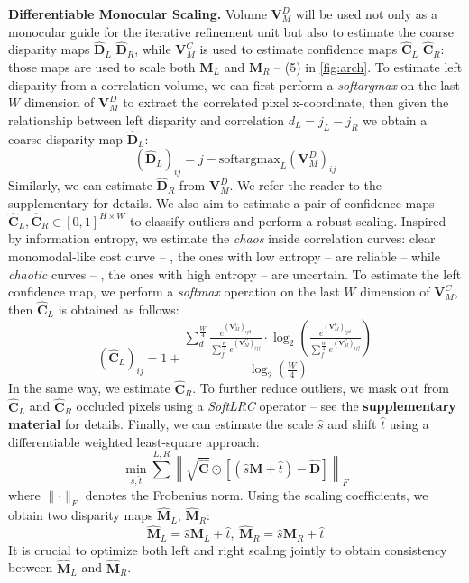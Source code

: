 \textbf{Differentiable Monocular Scaling.} Volume $\mathbf{V}^D_M$ will be used not only as a monocular guide for the iterative refinement unit but also to estimate the coarse disparity maps $\hat{\mathbf{D}}_L$ $\hat{\mathbf{D}}_R$, while $\mathbf{V}^C_M$ is used to estimate confidence maps $\hat{\mathbf{C}}_L$ $\hat{\mathbf{C}}_R$: those maps are used to scale both $\mathbf{M}_L$ and $\mathbf{M}_R$ -- (5) in \cref{fig:arch}. 
To estimate left disparity from a correlation volume, we can first perform a \textit{softargmax} on the last $W$ dimension of $\mathbf{V}^D_M$ to extract the correlated pixel x-coordinate, then given the relationship between left disparity and correlation $d_L=j_L-j_R$ we obtain a coarse disparity map $\hat{\mathbf{D}}_L$: 
\begin{equation} 
    (\hat{\mathbf{D}}_L)_{ij} = j - \text{softargmax}_L(\mathbf{V}^D_M)_{ij}
    \label{eq:softmax_left}
\end{equation}
Similarly, we can estimate $\hat{\mathbf{D}}_R$ from $\mathbf{V}^D_M$. We refer the reader to the supplementary for details.
We also aim to estimate a pair of confidence maps $\hat{\mathbf{C}}_L, \hat{\mathbf{C}}_R \in [0,1]^{H \times W}$ to classify outliers and perform a robust scaling.
Inspired by information entropy, we estimate the \textit{chaos} inside correlation curves: clear monomodal-like cost curve -- \ie, the ones with low entropy -- are reliable -- while \textit{chaotic} curves -- \ie, the ones with high entropy -- are uncertain.
To estimate the left confidence map, we perform a \textit{softmax} operation on the last $W$ dimension of $\mathbf{V}^C_M$, then $\hat{\mathbf{C}}_L$ is obtained as follows:
\begin{equation}
    (\hat{\mathbf{C}}_L)_{ij} = 1  + \frac{\sum_{d}^{\frac{W}{4}} \frac{e^{(\mathbf{V}^C_M)_{ijd}}}{\sum_{f}^{\frac{W}{4}} e^{(\mathbf{V}^C_M)_{ijf}}} \cdot \log_2 \left( \frac{e^{(\mathbf{V}^C_M)_{ijd}}}{\sum_{f}^{\frac{W}{4}} e^{(\mathbf{V}^C_M)_{ijf}}} \right)}{\log_2(\frac{W}{4})}
    \label{eq:confidence_left}
\end{equation}
In the same way, we estimate $\hat{\mathbf{C}}_R$.
To further reduce outliers, we mask out from $\hat{\mathbf{C}}_L$ and $\hat{\mathbf{C}}_R$ occluded pixels using a \textit{SoftLRC} operator -- see the \textbf{supplementary material} for details.
Finally, we can estimate the scale $\hat{s}$ and shift $\hat{t}$ using a differentiable weighted least-square approach:
\begin{equation}
    \min_{\hat{s}, \hat{t}} \sum_{}^{L,R} \left\lVert \sqrt{\hat{\mathbf{C}}}\odot\left[\left(\hat{s}\mathbf{M} + \hat{t}\right)  - \hat{\mathbf{D}} \right] \right\rVert_F 
    \label{eq:scale_shift}
\end{equation}
where $\lVert\cdot\rVert_F$ denotes the Frobenius norm.
Using the scaling coefficients, we obtain two disparity maps $\hat{\mathbf{M}}_L$, $\hat{\mathbf{M}}_R$:
\begin{equation}
    \hat{\mathbf{M}}_L = \hat{s}\mathbf{M}_L + \hat{t},\ \hat{\mathbf{M}}_R = \hat{s}\mathbf{M}_R + \hat{t}
    \label{eq:scaling_op}
\end{equation}
It is crucial to optimize both left and right scaling jointly to obtain consistency between $\hat{\mathbf{M}}_L$ and $\hat{\mathbf{M}}_R$.


